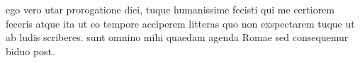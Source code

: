 


 ego vero utar prorogatione diei, tuque humanissime fecisti qui me certiorem feceris atque ita ut eo tempore acciperem litteras quo non exspectarem tuque ut ab ludis scriberes. sunt omnino mihi quaedam agenda Romae sed consequemur biduo post.
